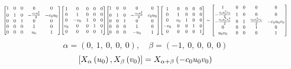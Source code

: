 \documentclass[11pt]{article}
\theoremstyle{definition}
\begin{document}
\[
\scaletoalign{\textwidth}{{\left[\begin{matrix}1 & 0 & 0 & 0 & 0\\0 & 1 & 0 & - \frac{c_{0} u_{0}^{2}}{2} & - c_{0} u_{0}\\0 & 0 & 1 & 0 & 0\\0 & 0 & 0 & 1 & 0\\0 & 0 & 0 & u_{0} & 1\end{matrix}\right]} {\left[\begin{matrix}1 & 0 & 0 & 0 & 0\\0 & 1 & 0 & 0 & 0\\0 & - v_{0} & 1 & 0 & 0\\v_{0} & 0 & 0 & 1 & 0\\0 & 0 & 0 & 0 & 1\end{matrix}\right]} {\left[\begin{matrix}1 & 0 & 0 & 0 & 0\\0 & 1 & 0 & - \frac{c_{0} u_{0}^{2}}{2} & c_{0} u_{0}\\0 & 0 & 1 & 0 & 0\\0 & 0 & 0 & 1 & 0\\0 & 0 & 0 & - u_{0} & 1\end{matrix}\right]} {\left[\begin{matrix}1 & 0 & 0 & 0 & 0\\0 & 1 & 0 & 0 & 0\\0 & v_{0} & 1 & 0 & 0\\- v_{0} & 0 & 0 & 1 & 0\\0 & 0 & 0 & 0 & 1\end{matrix}\right]} = {\left[\begin{matrix}1 & 0 & 0 & 0 & 0\\- \frac{c_{0} u_{0}^{2} v_{0}}{2} & 1 & 0 & 0 & 0\\- \frac{c_{0} u_{0}^{2} v_{0}^{2}}{2} & 0 & 1 & \frac{c_{0} u_{0}^{2} v_{0}}{2} & - c_{0} u_{0} v_{0}\\0 & 0 & 0 & 1 & 0\\u_{0} v_{0} & 0 & 0 & 0 & 1\end{matrix}\right]}}
\]
\[
\alpha = \left( 0, \  1, \  0, \  0, \  0\right), \quad \beta = \left( -1, \  0, \  0, \  0, \  0\right)
\]
\[
\scaletoalign{\textwidth}{\left[ X_{\alpha}\left(u_{0}\right), X_{\beta}\left(v_{0}\right) \right] = X_{\alpha + \beta}\left(- c_{0} u_{0} v_{0}\right)}
\]
\end{document}
